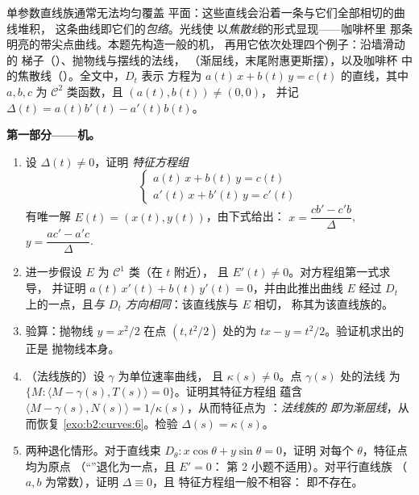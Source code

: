 \begin{problem}\label{pb:b2:curves:1}
单参数直线族通常无法均匀覆盖
平面：这些直线会沿着一条与它们全部相切的曲线堆积，
这条曲线即它们的\emph{包络}。光线使
以\emph{焦散线}的形式显现——咖啡杯里
那条明亮的带尖点曲线。本题先构造一般的机，
再用它依次处理四个例子：沿墙滑动的
梯子（）、抛物线与摆线的法线，
（渐屈线，末尾附惠更斯摆），以及咖啡杯
中的焦散线（）。全文中，$D_t$ 表示
方程为 $a(t)\,x + b(t)\,y = c(t)$ 的直线，其中 $a, b, c$
为 $\mathcal C^2$ 类函数，且 $(a(t), b(t)) \neq (0,0)$，
并记 $\Delta(t) = a(t)b'(t) - a'(t)b(t)$。

\medskip
\noindent\textbf{第一部分——机。}
\begin{enumerate}
  \item 设 $\Delta(t) \neq 0$，证明
        \emph{特征方程组}
        \[
        \begin{cases} a(t)\,x + b(t)\,y = c(t)\\
        a'(t)\,x + b'(t)\,y = c'(t)\end{cases}
        \]
        有唯一解 $E(t) = (x(t), y(t))$，由下式给出：
        $x = \dfrac{cb' - c'b}{\Delta}$, $y = \dfrac{ac' -
        a'c}{\Delta}$.
  \item 进一步假设 $E$ 为 $\mathcal C^1$ 类（在 $t$ 附近），
        且 $E'(t) \neq 0$。对方程组第一式求导，
        并证明 $a(t)\,x'(t) +
        b(t)\,y'(t) = 0$，并由此推出曲线 $E$
        经过 $D_t$ 上的一点，且\emph{与
        $D_t$ 方向相同}：该直线族与 $E$ 相切，
        称其为该直线族的\emph{}。
  \item 验算：抛物线 $y =
        x^2/2$ 在点 $(t, t^2/2)$ 处的为 $tx - y =
        t^2/2$。验证机求出的正是
        抛物线本身。
  \item （法线族的）设 $\gamma$ 为单位速率曲线，
        且 $\kappa(s) \neq 0$。点 $\gamma(s)$ 处的法线
        为 $\{M : \langle M - \gamma(s), T(s)
        \rangle = 0\}$。证明其特征方程组
        蕴含 $\langle M - \gamma(s), N(s)\rangle =
        1/\kappa(s)$，从而特征点为
        ：\emph{法线族的
        即为渐屈线}，从而恢复
        \cref{exo:b2:curves:6}。检验 $\Delta(s) =
        \kappa(s)$。
  \item 两种退化情形。对于直线束 $D_\theta : x\cos
        \theta + y\sin\theta = 0$，证明
        对每个 $\theta$，特征点均为原点
        （“”退化为一点，且 $E' = 0$：
        第 2 小题不适用）。对平行直线族
        （$a, b$ 为常数），证明 $\Delta \equiv 0$，且
        特征方程组一般不相容：
        即不存在。
\end{enumerate}


\end{problem}
